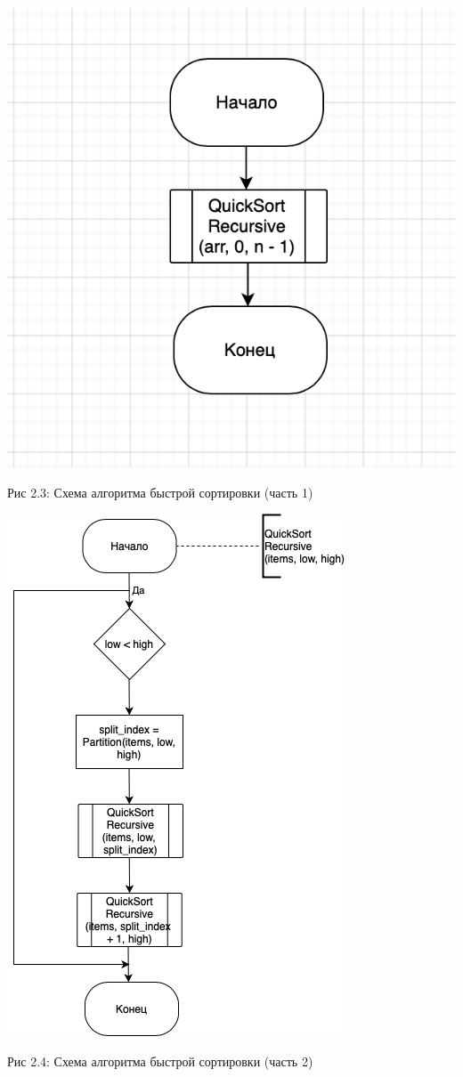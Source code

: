 \documentclass[12pt]{report}
\begin{document}
\begin{center}
		\includegraphics[scale=0.8]{QuickSort.png}
		
			Рис 2.3: Схема алгоритма быстрой сортировки (часть 1)
\end{center}

\begin{center}
		\includegraphics[scale=1.1]{QuickSortRec.png}
		
			Рис 2.4: Схема алгоритма быстрой сортировки (часть 2)
\end{center}
\end{document}
